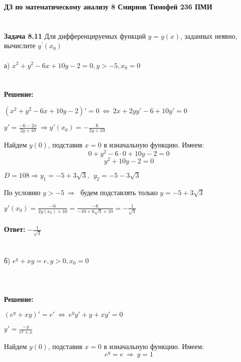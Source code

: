 \documentclass[12pt]{article}
\begin{document}
{\center \bf \large ДЗ по математическому анализу 8 Смирнов Тимофей 236 ПМИ}
    \\ \\ \\
    {\large \bf Задача 8.11} Для дифференцируемых функций $y=y(x)$, заданных неявно, вычислите $y^{'}(x_0)$
    \\
    \\ а) $x^2 + y^2 - 6x + 10y -2 = 0, y > -5, x_0=0$\\
    \\
    \\ \textbf{Решение: } 
    \par $(x^2 + y^2 - 6x + 10y -2)' = 0 \ \Longleftrightarrow \ 2x + 2yy' - 6 + 10y' = 0$
    \\
    \par $y' = \frac{-6 - 2x}{2y + 10} \ \Rightarrow  y'(x_0) = -\frac{6}{2y + 10}$
    \\
    \par Найдем $y(0)$, подставив $x = 0$ в изначальную функцию. Имеем: 
    \[
      0 + y^2 - 6 \cdot 0 + 10y - 2 = 0
    \]
    \[
      y^2 + 10y - 2 = 0 
    \]
    \par $D = 108 \Rightarrow y_1 = -5 + 3\sqrt{3}, \ \ y_2 = -5 - 3\sqrt{3}$
    \\
    \par По условию $y > -5 \ \Rightarrow \ $ будем подставлять только $y = -5 + 3\sqrt{3}$
    \\
    \par $y'(x_0) = \frac{-6}{2y(x_0) + 10} = \frac{-6}{-10 + 6\sqrt{3} + 10} = -\frac{1}{\sqrt{3}}$
    \\
    \\ \textbf{Ответ: } $-\frac{1}{\sqrt{3}}$
    \\
    \\
    \\ б) $e^y + xy = e, y > 0, x_0 = 0$\\
    \\
    \\
    \\ \textbf{Решение: } 
    \par $(e^y + xy)' = e' \ \Longleftrightarrow \ e^yy' + y + xy' = 0$
    \\
    \par $y' = \frac{-y}{e^y + x}$
    \\
    \par Найдем $y(0)$, подставив $x = 0$ в изначальную функцию. Имеем:
    \[
      e^y = e \ \Rightarrow \ y = 1  
    \]
\end{document}

